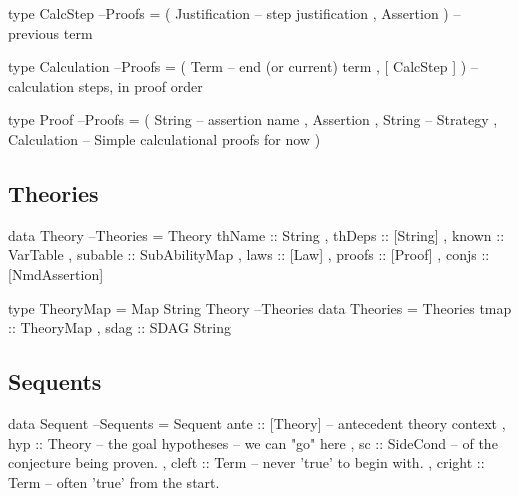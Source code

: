 \begin{code}
type CalcStep                                                         --Proofs
  = ( Justification  -- step justification
    , Assertion )         -- previous term
\end{code}

\begin{code}
type Calculation                                                      --Proofs
  = ( Term -- end (or current) term
    , [ CalcStep ] )  -- calculation steps, in proof order
\end{code}

\begin{code}
type Proof                                                            --Proofs
  = ( String -- assertion name
    , Assertion
    , String -- Strategy
    , Calculation -- Simple calculational proofs for now
    )
\end{code}


\subsection{Theories}

\begin{code}
data Theory                                                         --Theories
  = Theory {
      thName   :: String
    , thDeps   :: [String]
    , known    :: VarTable
    , subable  :: SubAbilityMap
    , laws     :: [Law]
    , proofs   :: [Proof]
    , conjs    :: [NmdAssertion]
    }
\end{code}

\begin{code}
type TheoryMap = Map String Theory                                  --Theories
data Theories
  = Theories { tmap :: TheoryMap
             , sdag :: SDAG String }
\end{code}

\subsection{Sequents}

\begin{code}
data Sequent                                                        --Sequents
  = Sequent {
     ante :: [Theory] -- antecedent theory context
   , hyp :: Theory -- the goal hypotheses -- we can "go" here
   , sc :: SideCond -- of the conjecture being proven.
   , cleft :: Term -- never 'true' to begin with.
   , cright :: Term -- often 'true' from the start.
   }
\end{code}

